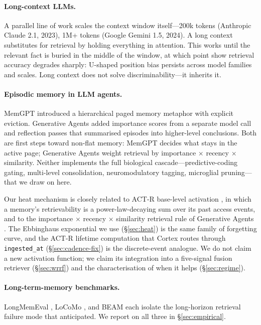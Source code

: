 \documentclass[11pt]{article}
\begin{document}
\paragraph{Long-context LLMs.}
A parallel line of work scales the context window
itself---200k tokens (Anthropic Claude 2.1, 2023), 1M+ tokens
(Google Gemini 1.5, 2024).  A long context substitutes for retrieval
by holding everything in attention.  This works until the relevant
fact is buried in the middle of the window, at which point
\citet{Liu2023} show retrieval accuracy degrades sharply: U-shaped
position bias persists across model families and scales.  Long
context does not solve discriminability---it inherits it.

\paragraph{Episodic memory in LLM agents.}
MemGPT \citep{Packer2024} introduced a hierarchical paged memory
metaphor with explicit eviction.  Generative Agents \citep{Park2023}
added importance scores from a separate model call and reflection
passes that summarised episodes into higher-level conclusions.  Both
are first steps toward non-flat memory: MemGPT decides what stays
in the active page; Generative Agents weight retrieval by importance
$\times$ recency $\times$ similarity.  Neither implements the full
biological cascade---predictive-coding gating, multi-level
consolidation, neuromodulatory tagging, microglial pruning---that
we draw on here.

Our heat mechanism is closely related to ACT-R base-level activation
\citep{Anderson1991}, in which a memory's retrievability is a
power-law-decaying sum over its past access events, and to the
importance $\times$ recency $\times$ similarity retrieval rule of
Generative Agents \citep{Park2023}.  The Ebbinghaus exponential we
use (\S\ref{sec:heat}) is the same family of forgetting curve, and
the ACT-R lifetime computation that Cortex routes through
\texttt{ingested\_at} (\S\ref{sec:cadence-fix}) is the discrete-event
analogue.  We do not claim a new activation function; we claim its
integration into a five-signal fusion retriever (\S\ref{sec:wrrf}) and
the characterisation of when it helps (\S\ref{sec:regime}).

\paragraph{Long-term-memory benchmarks.}
LongMemEval \citep{Wu2025}, LoCoMo \citep{Maharana2024}, and BEAM
\citep{Tavakoli2026} each isolate the long-horizon retrieval failure
mode that \citet{Liu2023} anticipated.  We report on all three in
\S\ref{sec:empirical}.
\end{document}
